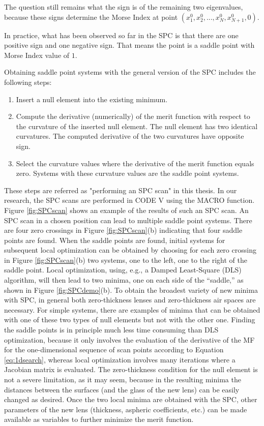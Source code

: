 The question still remains what the sign is of the remaining two eigenvalues, because these signs determine the Morse Index at point $(x^{0}_1, x^{0}_{2},...,x^{0}_{N},x^{0}_{N+1},0)$.
\vspace{0.3em}

In practice, what has been observed so far in the SPC is that there are one positive sign and one negative sign. That means the point is a saddle point with Morse Index value of $1$. 

Obtaining saddle point systems with the general version of the SPC includes the following steps:
\begin{enumerate}[nosep] \label{para: performing SPC scan}
\item Insert a null element into the existing minimum.
\item Compute the derivative (numerically) of the merit function with respect to the curvature of the inserted null element. The null element has two identical curvatures. The computed derivative of the two curvatures have opposite sign. 
\item Select the curvature values where the derivative of the merit function equals zero. Systems with these curvature values are the saddle point systems. 
\end{enumerate}
These steps are referred as "performing an SPC scan" in this thesis.  In our research, the SPC scans are performed in CODE V using the MACRO function. Figure \ref{fig:SPCscan} shows an example of the results of such an SPC scan. An SPC scan in a chosen position can lead to multiple saddle point systems.  There are four zero crossings in Figure \ref{fig:SPCscan}(b) indicating that four saddle points are found. When the saddle points are found, initial systems for subsequent local optimization can be obtained by choosing for each zero crossing in Figure \ref{fig:SPCscan}(b) two systems, one to the left, one to the right of the saddle point. Local optimization, using, e.g., a Damped Least-Square (DLS) algorithm, will then lead to two minima, one on each side of the “saddle,” as shown in Figure \ref{fig:SPCdemo}(b). To obtain the broadest variety of new minima with SPC, in general both zero-thickness lenses and zero-thickness air spaces are necessary. For simple systems, there are examples of minima that can be obtained with one of these two types of null elements but not with the other one. Finding the saddle points is in principle much less time consuming than DLS optimization, because it only involves the evaluation of the derivative of the MF for the one-dimensional sequence of scan points according to Equation \ref{eq:1dsearch}, whereas local optimization involves many iterations where a Jacobian matrix is evaluated. The zero-thickness condition for the null element is not a severe limitation, as it may seem, because in the resulting minima the distances between the surfaces (and the glass of the new lens) can be easily changed as desired. Once the two local minima are obtained with the SPC, other parameters of the new lens (thickness, aspheric coefficients, etc.) can be made available as variables to further minimize the merit function.

